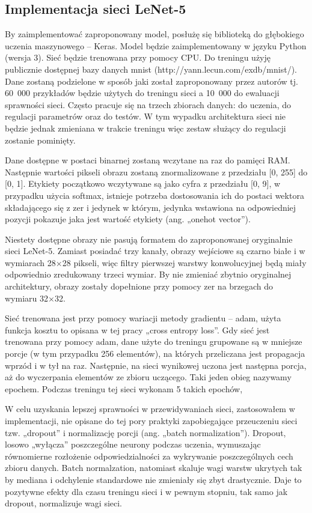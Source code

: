 \subsection{Implementacja sieci LeNet-5}

By zaimplementować zaproponowany model, posłużę się biblioteką do
głębokiego uczenia maszynowego -- Keras. Model będzie zaimplementowany w
języku Python (wersja 3). Sieć będzie trenowana przy pomocy CPU. Do
treningu użyję publicznie dostępnej bazy danych mnist
(http://yann.lecun.com/exdb/mnist/). Dane zostaną podzielone w
sposób jaki został zaproponowany przez autorów tj. 60~000 przykładów
będzie użytych do treningu sieci a 10~000 do ewaluacji sprawności sieci.
Często pracuje się na trzech zbiorach danych: do uczenia, do regulacji
parametrów oraz do testów. W tym wypadku architektura sieci nie będzie
jednak zmieniana w trakcie treningu więc zestaw służący do regulacji
zostanie pominięty.

Dane dostępne w postaci binarnej zostaną wczytane na raz do pamięci RAM.
Następnie wartości pikseli obrazu zostaną znormalizowane z przedziału
{[}0, 255{]} do {[}0, 1{]}. Etykiety początkowo wczytywane są jako cyfra
z przedziału {[}0, 9{]}, w przypadku użycia softmax, istnieje potrzeba
dostosowania ich do postaci wektora składającego się z zer i jedynek w
którym, jedynka wstawiona na odpowiedniej pozycji pokazuje jaka jest
wartość etykiety (ang. „onehot vector'').

Niestety dostępne obrazy nie pasują formatem do zaproponowanej
oryginalnie sieci LeNet-5. Zamiast posiadać trzy kanały, obrazy
wejściowe są czarno białe i w wymiarach 28\(\times\)28 pikseli, więc
filtry pierwszej warstwy konwolucyjnej będą miały odpowiednio
zredukowany trzeci wymiar. By nie zmieniać zbytnio oryginalnej
architektury, obrazy zostały dopełnione przy pomocy zer na brzegach do
wymiaru 32\(\times\)32.

Sieć trenowana jest przy pomocy wariacji metody gradientu -- adam, użyta
funkcja kosztu to opisana w tej pracy „cross entropy loss''. Gdy sieć
jest trenowana przy pomocy adam, dane użyte do treningu grupowane są w
mniejsze porcje (w tym przypadku 256 elementów), na których przeliczana
jest propagacja wprzód i w tył na raz. Następnie, na sieci wynikowej
uczona jest następna porcja, aż do wyczerpania elementów ze zbioru
uczącego. Taki jeden obieg nazywamy epochem. Podczas treningu tej sieci
wykonam 5 takich epochów,

W celu uzyskania lepszej sprawności w przewidywaniach sieci,
zastosowałem w implementacji, nie opisane do tej pory praktyki
zapobiegające przeuczeniu sieci tzw. „dropout'' i normalizację porcji
(ang. „batch normalization''). Dropout, losowo „wyłącza'' poszczególne
neurony podczas uczenia, wymuszając równomierne rozłożenie
odpowiedzialności za wykrywanie poszczególnych cech zbioru danych. Batch
normalzation, natomiast skaluje wagi warstw ukrytych tak by mediana i
odchylenie standardowe nie zmieniały się zbyt drastycznie. Daje to
pozytywne efekty dla czasu treningu sieci i w pewnym stopniu, tak samo
jak dropout, normalizuje wagi
sieci.

